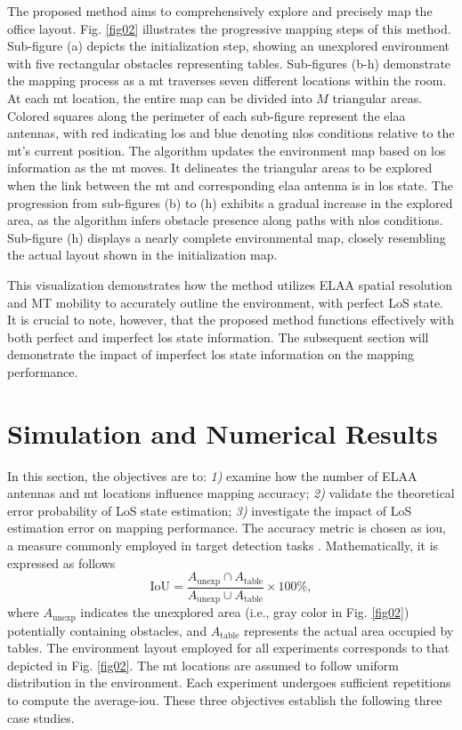 \documentclass[conference, a4paper]{IEEEtran}
\newcommand{\figref}[1]{Fig. \ref{#1}}
\begin{document}
The proposed method aims to comprehensively explore and precisely map the office layout. \figref{fig02} illustrates the progressive mapping steps of this method.
Sub-figure (a) depicts the initialization step, showing an unexplored environment with five rectangular obstacles representing tables.
Sub-figures (b-h) demonstrate the mapping process as a \gls{mt} traverses seven different locations within the room.
At each \gls{mt} location, the entire map can be divided into $M$ triangular areas.
Colored squares along the perimeter of each sub-figure represent the \gls{elaa} antennas, with red indicating \gls{los} and blue denoting \gls{nlos} conditions relative to the \gls{mt}'s current position.
The algorithm updates the environment map based on \gls{los} information as the \gls{mt} moves.
It delineates the triangular areas to be explored when the link between the \gls{mt} and corresponding \gls{elaa} antenna is in \gls{los} state. 
The progression from sub-figures (b) to (h) exhibits a gradual increase in the explored area, as the algorithm infers obstacle presence along paths with \gls{nlos} conditions.
Sub-figure (h) displays a nearly complete environmental map, closely resembling the actual layout shown in the initialization map.

This visualization demonstrates how the method utilizes ELAA spatial resolution and MT mobility to accurately outline the environment, with perfect LoS state.
It is crucial to note, however, that the proposed method functions effectively with both perfect and imperfect \gls{los} state information.
The subsequent section will demonstrate the impact of imperfect \gls{los} state information on the mapping performance.

\section{Simulation and Numerical Results} \label{sec05}
In this section, the objectives are to:
\textit{1)} examine how the number of ELAA antennas and \gls{mt} locations influence mapping accuracy;
\textit{2)} validate the theoretical error probability of LoS state estimation; 
\textit{3)} investigate the impact of LoS estimation error on mapping performance.
The accuracy metric is chosen as \gls{iou}, a measure commonly employed in target detection tasks \cite{Rezatofighi2019}.
Mathematically, it is expressed as follows
\begin{equation}
	\mathrm{IoU} = \dfrac{A_{\text{unexp}} \cap A_{\text{table}}}{A_{\text{unexp}} \cup A_{\text{table}}} \times 100 \%,
\end{equation}
where $A_{\text{unexp}}$ indicates the unexplored area (i.e., gray color in \figref{fig02}) potentially containing obstacles, and $A_{\text{table}}$ represents the actual area occupied by tables.
The environment layout employed for all experiments corresponds to that depicted in \figref{fig02}.
The \gls{mt} locations are assumed to follow uniform distribution in the environment.
Each experiment undergoes sufficient repetitions to compute the average-\gls{iou}.
These three objectives establish the following three case studies.
\end{document}
